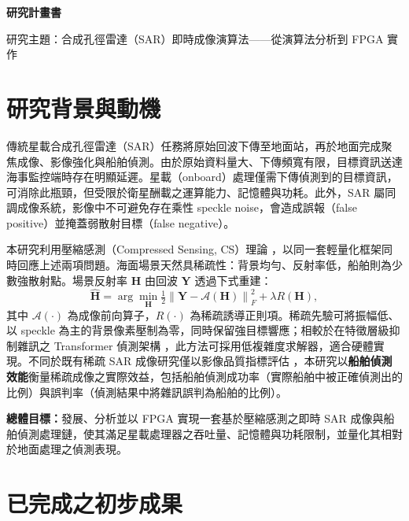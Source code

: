 \documentclass[11pt,fontset=none]{ctexart}
\begin{document}
\begin{center}
  {\Large\bfseries 研究計畫書\par}
  \vspace{2pt}
  {\large 研究主題：合成孔徑雷達（SAR）即時成像演算法——從演算法分析到 FPGA 實作\par}
\end{center}

\section{研究背景與動機}

傳統星載合成孔徑雷達（SAR）任務將原始回波下傳至地面站，再於地面完成聚焦成像、影像強化與船舶偵測。由於原始資料量大、下傳頻寬有限，目標資訊送達海事監控端時存在明顯延遲。星載（onboard）處理僅需下傳偵測到的目標資訊，可消除此瓶頸，但受限於衛星酬載之運算能力、記憶體與功耗。此外，SAR 屬同調成像系統，影像中不可避免存在乘性 speckle noise，會造成誤報（false positive）並掩蓋弱散射目標（false negative）。

本研究利用壓縮感測（Compressed Sensing, CS）理論 \cite{donoho_cs, candes_cs}，以同一套輕量化框架同時回應上述兩項問題。海面場景天然具稀疏性：背景均勻、反射率低，船舶則為少數強散射點。場景反射率 $\mathbf{H}$ 由回波 $\mathbf{Y}$ 透過下式重建：
\begin{equation}
  \hat{\mathbf{H}} = \arg\min_{\mathbf{H}} \tfrac{1}{2}\left\|\mathbf{Y} - \mathcal{A}(\mathbf{H})\right\|_F^2 + \lambda R(\mathbf{H}),
  \label{eq:cs}
\end{equation}
其中 $\mathcal{A}(\cdot)$ 為成像前向算子，$R(\cdot)$ 為稀疏誘導正則項。稀疏先驗可將振幅低、以 speckle 為主的背景像素壓制為零，同時保留強目標響應；相較於在特徵層級抑制雜訊之 Transformer 偵測架構 \cite{sares_deim, cvmt}，此方法可採用低複雜度求解器，適合硬體實現。不同於既有稀疏 SAR 成像研究僅以影像品質指標評估 \cite{sparse_sar_imaging, zhang_reweighted, liu_compound_reg}，本研究以\textbf{船舶偵測效能}衡量稀疏成像之實際效益，包括船舶偵測成功率（實際船舶中被正確偵測出的比例）與誤判率（偵測結果中將雜訊誤判為船舶的比例）。

\textbf{總體目標：}發展、分析並以 FPGA 實現一套基於壓縮感測之即時 SAR 成像與船舶偵測處理鏈，使其滿足星載處理器之吞吐量、記憶體與功耗限制，並量化其相對於地面處理之偵測表現。

\section{已完成之初步成果}
\end{document}
